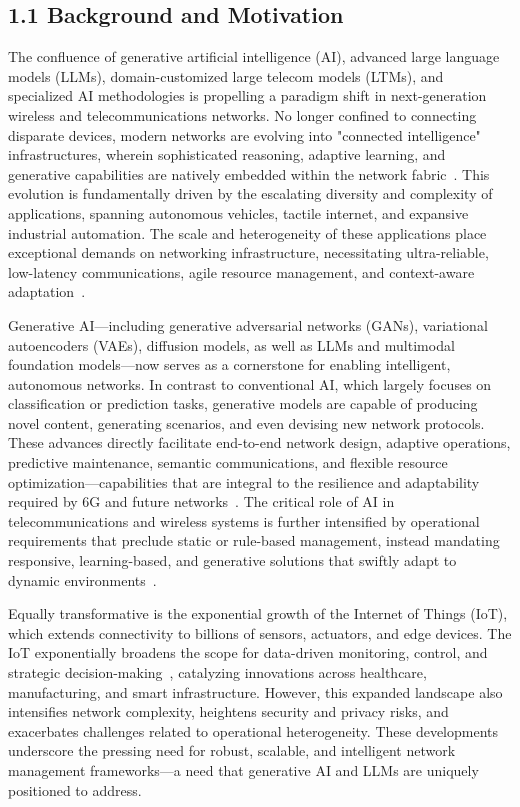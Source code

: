 \documentclass[11pt]{article}
\begin{document}
\subsection{1.1 Background and Motivation}

The confluence of generative artificial intelligence (AI), advanced large language models (LLMs), domain-customized large telecom models (LTMs), and specialized AI methodologies is propelling a paradigm shift in next-generation wireless and telecommunications networks. No longer confined to connecting disparate devices, modern networks are evolving into "connected intelligence" infrastructures, wherein sophisticated reasoning, adaptive learning, and generative capabilities are natively embedded within the network fabric~\cite{ref46, ref49}. This evolution is fundamentally driven by the escalating diversity and complexity of applications, spanning autonomous vehicles, tactile internet, and expansive industrial automation. The scale and heterogeneity of these applications place exceptional demands on networking infrastructure, necessitating ultra-reliable, low-latency communications, agile resource management, and context-aware adaptation~\cite{ref46, ref49}.

Generative AI—including generative adversarial networks (GANs), variational autoencoders (VAEs), diffusion models, as well as LLMs and multimodal foundation models—now serves as a cornerstone for enabling intelligent, autonomous networks. In contrast to conventional AI, which largely focuses on classification or prediction tasks, generative models are capable of producing novel content, generating scenarios, and even devising new network protocols. These advances directly facilitate end-to-end network design, adaptive operations, predictive maintenance, semantic communications, and flexible resource optimization—capabilities that are integral to the resilience and adaptability required by 6G and future networks~\cite{ref1, ref7, ref21, ref26, ref33}. The critical role of AI in telecommunications and wireless systems is further intensified by operational requirements that preclude static or rule-based management, instead mandating responsive, learning-based, and generative solutions that swiftly adapt to dynamic environments~\cite{ref13, ref21, ref26}.

Equally transformative is the exponential growth of the Internet of Things (IoT), which extends connectivity to billions of sensors, actuators, and edge devices. The IoT exponentially broadens the scope for data-driven monitoring, control, and strategic decision-making~\cite{ref45}, catalyzing innovations across healthcare, manufacturing, and smart infrastructure. However, this expanded landscape also intensifies network complexity, heightens security and privacy risks, and exacerbates challenges related to operational heterogeneity. These developments underscore the pressing need for robust, scalable, and intelligent network management frameworks—a need that generative AI and LLMs are uniquely positioned to address.
\end{document}
